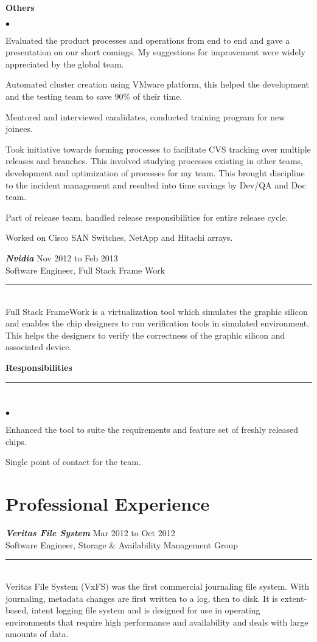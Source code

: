 \documentclass[letterpaper,margin,line]{RES}
\newenvironment{list2}{
  \begin{list}{$\bullet$}{%
      \setlength{\itemsep}{1pt}
      \setlength{\parsep}{0in} \setlength{\parskip}{0in}
      \setlength{\topsep}{0in} \setlength{\partopsep}{0in} 
      \setlength{\leftmargin}{0.2in}}}{\end{list}}
\def\myline{\\\rule{\textwidth}{1pt}\\}
\def\mmyline{\\\rule{\textwidth}{.5pt}\\}
\begin{document}
\begin{resume}
{ \bf Others }
    \begin{list2}
	\item Evaluated the product processes and operations from end to end and gave a presentation on our short comings. My suggestions for improvement were widely appreciated by the global team.
    \item Automated cluster creation using VMware platform, this helped the development and the testing team to save 90\% of their time.  
    \item Mentored and interviewed candidates, conducted training program for new joinees.
    \item Took initiative towards forming processes to facilitate CVS tracking over multiple releases and branches. This involved studying processes existing in other teams, development and optimization of processes for my team. This brought discipline to the incident management and resulted into time savings by Dev/QA and Doc team.
    \item Part of release team, handled release responsibilities for entire release cycle.
    \item Worked on Cisco SAN Switches, NetApp and Hitachi arrays.
    \end{list2}

{\sl \bf Nvidia} \hfill Nov 2012 to Feb 2013 \\
		 Software Engineer, Full Stack Frame Work
       \myline
       Full Stack FrameWork is a virtualization tool which simulates the 
       graphic silicon and enables the chip designers to run verification 
       tools in simulated environment. This helps the designers to verify 
       the correctness of the graphic silicon and associated device.

{ \bf Responsibilities}
\mmyline
	\begin{list2}
    \item Enhanced the tool to suite the requirements and feature set of freshly released chips.
    \item Single point of contact for the team.
    \end{list2}

\section{\sc Professional Experience }
{\sl \bf Veritas File System} \hfill Mar 2012 to  Oct 2012 \\
		 Software Engineer, Storage \& Availability Management
		 Group
       \myline
       Veritas File System (VxFS) was the first commercial journaling file system. With
       journaling, metadata changes are first written to a log, then to disk.
       It is extent-based, intent logging file system and is designed for use
       in operating environments that require high performance and availability and
       deals with large amounts of data.


\end{resume}
\end{document}
